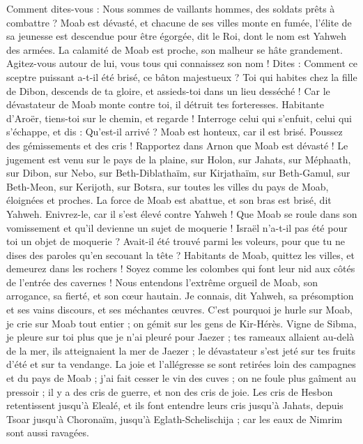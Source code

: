 \begin{multicols}{2}
Comment dites-vous : Nous sommes de vaillants hommes, des soldats prêts à combattre ?
Moab est dévasté, et chacune de ses villes monte en fumée, l'élite de sa jeunesse est descendue pour être égorgée, dit le Roi, dont le nom est Yahweh des armées.
La calamité de Moab est proche, son malheur se hâte grandement.
Agitez-vous autour de lui, vous tous qui connaissez son nom ! Dites : Comment ce sceptre puissant a-t-il été brisé, ce bâton majestueux ?
Toi qui habites chez la fille de Dibon, descends de ta gloire, et assieds-toi dans un lieu desséché ! Car le dévastateur de Moab monte contre toi, il détruit tes forteresses.
Habitante d'Aroër, tiens-toi sur le chemin, et regarde ! Interroge celui qui s'enfuit, celui qui s'échappe, et dis : Qu'est-il arrivé ?
Moab est honteux, car il est brisé. Poussez des gémissements et des cris ! Rapportez dans Arnon que Moab est dévasté !
Le jugement est venu sur le pays de la plaine, sur Holon, sur Jahats, sur Méphaath,
sur Dibon, sur Nebo, sur Beth-Diblathaïm,
sur Kirjathaïm, sur Beth-Gamul, sur Beth-Meon,
sur Kerijoth, sur Botsra, sur toutes les villes du pays de Moab, éloignées et proches.
La force de Moab est abattue, et son bras est brisé, dit Yahweh.
Enivrez-le, car il s'est élevé contre Yahweh ! Que Moab se roule dans son vomissement et qu'il devienne un sujet de moquerie !
Israël n'a-t-il pas été pour toi un objet de moquerie ? Avait-il été trouvé parmi les voleurs, pour que tu ne dises des paroles qu'en secouant la tête ?
Habitants de Moab, quittez les villes, et demeurez dans les rochers ! Soyez comme les colombes qui font leur nid aux côtés de l'entrée des cavernes !
Nous entendons l'extrême orgueil de Moab, son arrogance, sa fierté, et son cœur hautain.
Je connais, dit Yahweh, sa présomption et ses vains discours, et ses méchantes œuvres.
C'est pourquoi je hurle sur Moab, je crie sur Moab tout entier ; on gémit sur les gens de Kir-Hérès.
Vigne de Sibma, je pleure sur toi plus que je n'ai pleuré pour Jaezer ; tes rameaux allaient au-delà de la mer, ils atteignaient la mer de Jaezer ; le dévastateur s'est jeté sur tes fruits d'été et sur ta vendange.
La joie et l'allégresse se sont retirées loin des campagnes et du pays de Moab ; j'ai fait cesser le vin des cuves ; on ne foule plus gaîment au pressoir ; il y a des cris de guerre, et non des cris de joie.
Les cris de Hesbon retentissent jusqu'à Elealé, et ils font entendre leurs cris jusqu'à Jahats, depuis Tsoar jusqu'à Choronaïm, jusqu'à Eglath-Schelischija ; car les eaux de Nimrim sont aussi ravagées.

\end{multicols}
